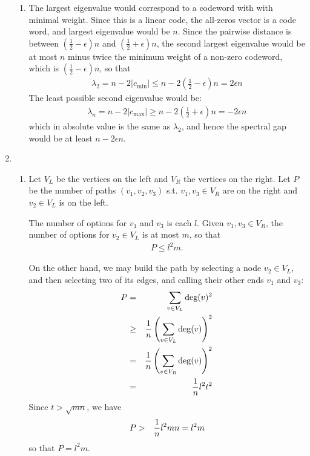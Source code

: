 \documentclass[11pt]{article} \usepackage{amssymb}
\newcommand{\half}{{\textstyle \frac12}}
\begin{document}
\begin{enumerate}
\begin{enumerate}
  \item
  The largest eigenvalue would correspond to a codeword with with minimal
  weight. Since this is a linear code, the all-zeros vector is a code word,
  and largest eigenvalue would be $n$. Since the pairwise distance is between
  $(\half-\epsilon)n$ and $(\half+\epsilon)n$, the second largest eigenvalue would be at most $n$
  minus twice the minimum weight of a non-zero codeword, which is 
  $(\half-\epsilon)n$, so that
  \begin{eqnarray*}
    \lambda_2= n-2|c_{\min}|\leq n-2(\half-\epsilon)n=2\epsilon n
  \end{eqnarray*}
  The least possible second eigenvalue would be:
  \begin{eqnarray*}
    \lambda_n= n-2|c_{\max}|\geq n-2(\half+\epsilon)n=-2\epsilon n
  \end{eqnarray*}
  which in absolute value is the same as $\lambda_2$, and hence the spectral
  gap would be at least $n-2\epsilon n$.
  \end{enumerate}
  \item
    \begin{enumerate}
    \item 
    Let $V_L$ be the vertices on the left and $V_R$ the vertices on the right.
    Let $P$ be the number of paths $(v_1,v_2,v_3)$ s.t. $v_1,v_3\in V_R$ are on the
    right and $v_2\in V_L$ is on the left. 

    The number of options for $v_1$ and $v_3$
    is each $l$. Given $v_1,v_3\in V_R$, the number of options for $v_2\in V_L$ is
    at most $m$, so that
    \begin{eqnarray*}
      P\leq l^2m.
    \end{eqnarray*}

    On the other hand, we may build the path by selecting a node $v_2\in V_L$,
    and then selecting two of its edges, and calling their other ends
    $v_1$ and $v_3$:
   \begin{eqnarray*}
      P&=&\sum_{v\in V_L}\deg(v)^2
      \\ &\geq&{1\over n}\left(\sum_{v\in V_L}\deg(v)\right)^2
      \\ &=&{1\over n}\left(\sum_{v\in V_R}\deg(v)\right)^2
      \\ &=&{1\over n}l^2t^2
    \end{eqnarray*}
    Since $t>\sqrt{mn}$, we have
   \begin{eqnarray*}
      P&>&{1\over n}l^2mn=l^2m 
    \end{eqnarray*}
    so that $P=l^2m$.
    \end{enumerate}
\end{enumerate}
\end{document}

